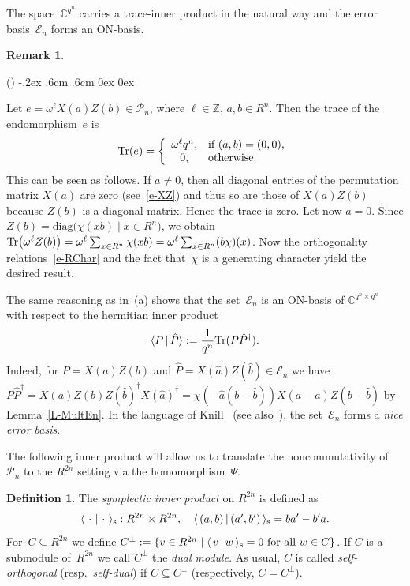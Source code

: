 \documentclass[11pt]{article}
\theoremstyle{definition}
\newtheorem{defi}[theo]{Definition}
\newtheorem{rem}[theo]{Remark}
\numberwithin{equation}{section}
\newcommand{\Z}{{\mathbb Z}}
\newcommand{\C}{{\mathbb C}}
\newcommand{\cE}{{\mathcal E}}
\newcommand{\cP}{{\mathcal P}}
\newcommand{\Tr}{\mbox{\rm Tr}}
\newcommand{\inner}[2]{\mbox{$\langle{#1}\,|\,{#2}\rangle$}}
\newcommand{\inners}[2]{\mbox{$\langle{\,{#1}\,}|\,{#2}\,\rangle_{\rm s}$}}
\newcounter{alp}
\newcounter{ara}
\newenvironment{alphalist}{\begin{list}{(\alph{alp})\hfill}{\usecounter{alp}
     \topsep-.2ex \labelwidth.6cm \leftmargin.6cm \labelsep0cm
     \rightmargin0cm \parsep0ex \itemsep0ex}}{\end{list}}
\begin{document}
The space~$\C^{q^n}$ carries a trace-inner product in the natural way and the error basis~$\cE_n$ forms an ON-basis.

\begin{rem}\label{R-TracePn}
\begin{alphalist}
\item Let $e=\omega^\ell X(a)Z(b)\in\cP_n$, where $\ell\in\Z,\,a,b\in R^n$. Then the trace of the endomorphism~$e$ is
      \[
        \Tr(e)=\left\{\begin{array}{cl}\omega^\ell q^n,&\text{if }(a,b)=(0,0),\\ 0,&\text{otherwise.}
        \end{array}\right.
      \]
      This can be seen as follows.
      If $a\neq0$, then all diagonal entries of the permutation matrix $X(a)$ are zero (see~\eqref{e-XZ})
      and thus so are those of $X(a)Z(b)$ because $Z(b)$ is a diagonal matrix. Hence the trace is zero.
      Let now $a=0$. Since $Z(b)=\text{diag}\big(\chi(xb)\mid x\in R^n\big)$, we obtain
      $\Tr\big(\omega^\ell Z(b)\big)=\omega^\ell \sum_{x\in R^n}\chi(xb)=\omega^\ell\sum_{x\in R^n}(b\chi)(x)$.
      Now the orthogonality relations~\eqref{e-RChar} and the fact that~$\chi$ is a generating character yield the desired result.
\item The same reasoning as in~(a) shows that the set~$\cE_n$ is an ON-basis of $\C^{q^n\times q^n}$
      with respect to the hermitian inner product
      \begin{equation}\label{e-TraceInner}
        \inner{P}{\hat{P}}:=\frac{1}{q^n}\Tr(P\hat{P}^\dagger).
      \end{equation}
      Indeed, for $P=X(a)Z(b)$ and $\hat{P}=X(\hat{a})Z(\hat{b})\in\cE_n$ we have
      $P\hat{P}^\dagger=X(a)Z(b)Z(\hat{b})^\dagger X(\hat{a})^\dagger=\chi(-\hat{a}(b-\hat{b}))X(a-\hat{a})Z(b-\hat{b})$
      by Lemma~\ref{L-MultEn}.
      In the language of Knill~\cite{Kn96} (see also~\cite[p.~4893]{KKKS06}), the set~$\cE_n$ forms a \emph{nice error basis}.
\end{alphalist}
\end{rem}

The following inner product will allow us to translate the noncommutativity of~$\cP_n$ to the $R^{2n}$ setting via the homomorphism~$\Psi$.

\begin{defi}\label{D-Inner}
The \emph{symplectic inner product} on $R^{2n}$ is defined as
\[
   \inners{\,\cdot\,}{\,\cdot\,}: R^{2n}\times R^{2n},\quad \inners{(a,b)}{(a',b')}=ba'-b'a.
\]
For~$C\subseteq R^{2n}$ we define $C^\perp:=\{v\in R^{2n}\mid \inners{v}{w}=0\text{ for all }w\in C\}$.
If $C$ is a submodule of~$R^{2n}$ we call $C^\perp$ the \emph{dual module}.
As usual, $C$ is called \emph{self-orthogonal} (resp.\ \emph{self-dual}) if $C\subseteq C^\perp$ (respectively, $C=C^\perp$).
\end{defi}
\end{document}
